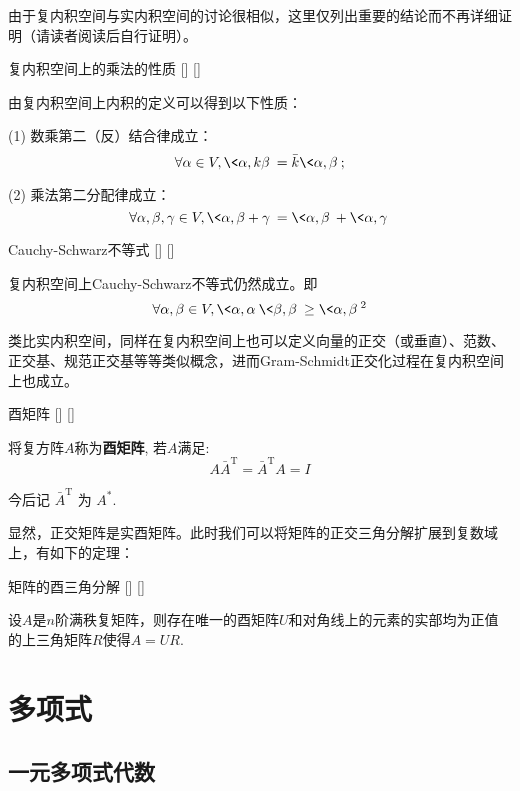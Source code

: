 \documentclass[UTF8]{ctexart}
\begin{document}
		由于复内积空间与实内积空间的讨论很相似，这里仅列出重要的结论而不再详细证明（请读者阅读后自行证明）。

		\begin{ppt}
			[]
			{复内积空间上的乘法的性质}
			[]
			[]

			由复内积空间上内积的定义可以得到以下性质：

			(1) 数乘第二（反）结合律成立：\[\forall \alpha\in V,\<\alpha,k\beta\>=\bar{k}\<\alpha,\beta\>;\]

			(2) 乘法第二分配律成立：\[\forall\alpha,\beta,\gamma\in V, \<\alpha,\beta+\gamma\>=\<\alpha,\beta\>+\<\alpha,\gamma\>\]
		\end{ppt}

		\begin{thm}
			[]
			{Cauchy-Schwarz不等式}
			[]
			[]

			复内积空间上Cauchy-Schwarz不等式仍然成立。即\[\forall\alpha, \beta\in V, \<\alpha,\alpha\>\<\beta,\beta\>\geq\<\alpha,\beta\>^2\]
		\end{thm}

		类比实内积空间，同样在复内积空间上也可以定义向量的正交（或垂直）、范数、正交基、规范正交基等等类似概念，进而Gram-Schmidt正交化过程在复内积空间上也成立。

		\begin{dfn}
			[]
			{酉矩阵}
			[]
			[]

			将复方阵$A$称为\textbf{酉矩阵}, 若$A$满足: 
			\[A\bar{A}^\mathrm{T}=\bar{A}^\mathrm{T}A=I\]

			今后记 $\bar{A}^\mathrm{T}$ 为 $A^*$.
		\end{dfn}

		显然，正交矩阵是实酉矩阵。此时我们可以将矩阵的正交三角分解扩展到复数域上，有如下的定理：

		\begin{thm}
			[]
			{矩阵的酉三角分解}
			[]
			[]

			设$A$是$n$阶满秩复矩阵，则存在唯一的酉矩阵$U$和对角线上的元素的实部均为正值的上三角矩阵$R$使得$A=UR$.
		\end{thm}

\section{多项式}
	
	\subsection{一元多项式代数}
		
\end{document}

